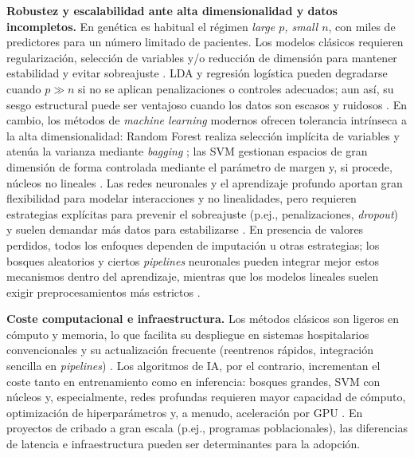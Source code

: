 \documentclass[11pt,a4paper,spanish]{book}
\numberwithin{equation}{chapter}
\numberwithin{figure}{chapter}
\begin{document}
\textbf{Robustez y escalabilidad ante alta dimensionalidad y datos incompletos.} En genética es habitual el régimen \emph{large $p$, small $n$}, con miles de predictores para un número limitado de pacientes. Los modelos clásicos requieren regularización, selección de variables y/o reducción de dimensión para mantener estabilidad y evitar sobreajuste \cite{10.1093/eurheartj/ehu207,CHEN2012}. LDA y regresión logística pueden degradarse cuando $p \gg n$ si no se aplican penalizaciones o controles adecuados; aun así, su sesgo estructural puede ser ventajoso cuando los datos son escasos y ruidosos \cite{dudoit2002}. En cambio, los métodos de \emph{machine learning} modernos ofrecen tolerancia intrínseca a la alta dimensionalidad: Random Forest realiza selección implícita de variables y atenúa la varianza mediante \emph{bagging} \cite{Breiman2001,CHEN2012,qi2012}; las SVM gestionan espacios de gran dimensión de forma controlada mediante el parámetro de margen y, si procede, núcleos no lineales \cite{cortes1995,suykens1999}. Las redes neuronales y el aprendizaje profundo aportan gran flexibilidad para modelar interacciones y no linealidades, pero requieren estrategias explícitas para prevenir el sobreajuste (p.ej., penalizaciones, \emph{dropout}) y suelen demandar más datos para estabilizarse \cite{LeCun_2015,Ching_2018}. En presencia de valores perdidos, todos los enfoques dependen de imputación u otras estrategias; los bosques aleatorios y ciertos \emph{pipelines} neuronales pueden integrar mejor estos mecanismos dentro del aprendizaje, mientras que los modelos lineales suelen exigir preprocesamientos más estrictos \cite{CHEN2012,Libbrecht2015}.

\textbf{Coste computacional e infraestructura.} Los métodos clásicos son ligeros en cómputo y memoria, lo que facilita su despliegue en sistemas hospitalarios convencionales y su actualización frecuente (reentrenos rápidos, integración sencilla en \emph{pipelines}) \cite{hosmer_2013,10.1093/eurheartj/ehu207}. Los algoritmos de IA, por el contrario, incrementan el coste tanto en entrenamiento como en inferencia: bosques grandes, SVM con núcleos y, especialmente, redes profundas requieren mayor capacidad de cómputo, optimización de hiperparámetros y, a menudo, aceleración por GPU \cite{Breiman2001,cortes1995,LeCun_2015}. En proyectos de cribado a gran escala (p.ej., programas poblacionales), las diferencias de latencia e infraestructura pueden ser determinantes para la adopción.
\end{document}
